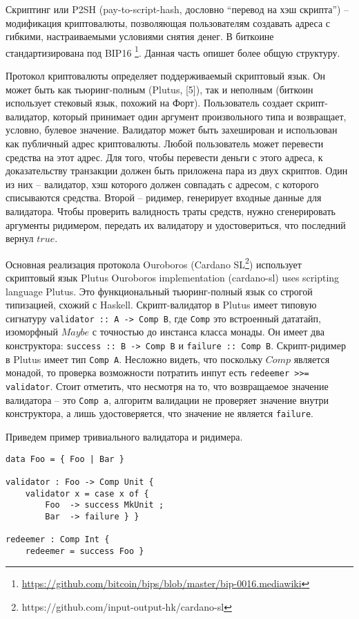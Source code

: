 \documentclass[]{itmo-student-thesis}
\begin{document}
Скриптинг или P2SH (pay-to-script-hash, дословно ``перевод на хэш
скрипта'') -- модификация криптовалюты, позволяющая пользователям
создавать адреса с гибкими, настраиваемыми условиями снятия денег. В
биткоине стандартизирована под
BIP16 \footnote{\url{https://github.com/bitcoin/bips/blob/master/bip-0016.mediawiki}}. Данная
часть опишет более общую структуру.

Протокол криптовалюты определяет поддерживаемый скриптовый язык. Он
может быть как тьюринг-полным (Plutus, [5]), так и неполным (биткоин
использует стековый язык, похожий на Форт). Пользователь создает
скрипт-валидатор, который принимает один аргумент произвольного типа и
возвращает, условно, булевое значение. Валидатор может быть
захеширован и использован как публичный адрес криптовалюты. Любой
пользователь может перевести средства на этот адрес. Для того, чтобы
перевести деньги с этого адреса, к доказательству транзакции должен
быть приложена пара из двух скриптов. Один из них -- валидатор, хэш
которого должен совпадать с адресом, с которого списываются
средства. Второй -- ридимер, генерирует входные данные для
валидатора. Чтобы проверить валидность траты средств, нужно
сгенерировать аргументы ридимером, передать их валидатору и
удостовериться, что последний вернул $true$.

Основная реализация протокола Ouroboros (Cardano
SL\footnote{https://github.com/input-output-hk/cardano-sl}) использует
скриптовый язык Plutus Ouroboros implementation (cardano-sl) uses
scripting language Plutus. Это функциональный тьюринг-полный язык со
строгой типизацией, схожий с Haskell. Скрипт-валидатор в Plutus имеет
типовую сигнатуру \lstinline|validator :: A -> Comp B|, где
\lstinline|Comp| это встроенный дататайп, изоморфный $Maybe$ с
точностью до инстанса класса монады. Он имеет два конструктора:
\lstinline|success :: B -> Comp B| и \lstinline|failure :: Comp
B|. Скрипт-ридимер в Plutus имеет тип \lstinline|Comp A|. Несложно
видеть, что поскольку $Comp$ является монадой, то проверка возможности
потратить инпут есть \lstinline|redeemer >>= validator|. Стоит
отметить, что несмотря на то, что возвращаемое значение валидатора --
это \lstinline|Comp a|, алгоритм валидации не проверяет значение
внутри конструктора, а лишь удостоверяется, что значение не является
\lstinline|failure|.

Приведем пример тривиального валидатора и ридимера.

\begin{lstlisting}[float=!h,caption={Пример пары валидатор/ридимер на Plutus}]
data Foo = { Foo | Bar }

validator : Foo -> Comp Unit {
    validator x = case x of {
        Foo  -> success MkUnit ;
        Bar  -> failure } }

redeemer : Comp Int {
    redeemer = success Foo }
\end{lstlisting}
\end{document}
